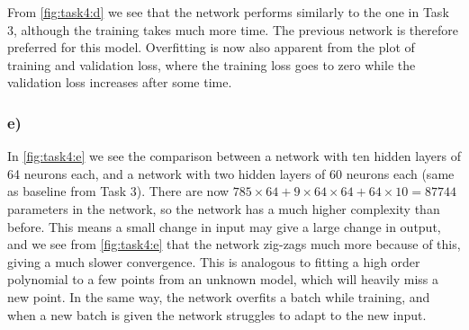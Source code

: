 From \cref{fig:task4:d} we see that the network performs similarly to the one in Task 3, although the training takes much more time. The previous network is therefore preferred for this model. Overfitting is now also apparent from the plot of training and validation loss, where the training loss goes to zero while the validation loss increases after some time. 

\subsubsection*{e)}

In \cref{fig:task4:e} we see the comparison between a network with ten hidden layers of 64 neurons each, and a network with two hidden layers of 60 neurons each (same as baseline from Task 3). There are now $785\times 64 + 9\times 64\times 64 + 64\times 10=87744$ parameters in the network, so the network has a much higher complexity than before. This means a small change in input may give a large change in output, and we see from \cref{fig:task4:e} that the network zig-zags much more because of this, giving a much slower convergence. This is analogous to fitting a high order polynomial to a few points from an unknown model, which will heavily miss a new point. In the same way, the network overfits a batch while training, and when a new batch is given the network struggles to adapt to the new input.  

